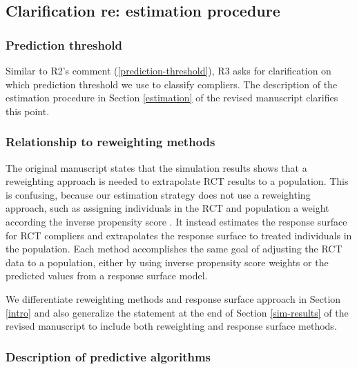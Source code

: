 \documentclass[hidelinks,12pt,letterpaper]{article}
\begin{document}
\subsection{Clarification re: estimation procedure}

\subsubsection{Prediction threshold}

Similar to R2's comment (\ref{prediction-threshold}), R3 asks for clarification on which prediction threshold we use to classify compliers. The description of the estimation procedure in Section \ref{estimation} of the revised manuscript clarifies this point. 

\subsubsection{Relationship to reweighting methods}

The original manuscript states that the simulation results shows that a reweighting approach is needed to extrapolate RCT results to a population. This is confusing, because our estimation strategy does not use a reweighting approach, such as assigning individuals in the RCT and population a weight according the inverse propensity score \citep{stuart2011use}. It instead estimates the response surface for RCT compliers and extrapolates the response surface to treated individuals in the population. Each method accomplishes the same goal of adjusting the RCT data to a population, either by using inverse propensity score weights or the predicted values from a response surface model. 

We differentiate reweighting methods and response surface approach in Section \ref{intro} and also generalize the statement at the end of Section \ref{sim-results} of the revised manuscript to include both reweighting and response surface methods. 

\subsubsection{Description of predictive algorithms}
\end{document}
